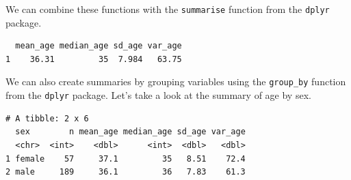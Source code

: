 \documentclass[]{book}
\newenvironment{Shaded}{\begin{snugshade}}{\end{snugshade}}
\newcommand{\CommentTok}[1]{\textcolor[rgb]{0.56,0.35,0.01}{\textit{#1}}}
\newcommand{\DataTypeTok}[1]{\textcolor[rgb]{0.13,0.29,0.53}{#1}}
\newcommand{\KeywordTok}[1]{\textcolor[rgb]{0.13,0.29,0.53}{\textbf{#1}}}
\newcommand{\NormalTok}[1]{#1}
\newcommand{\OperatorTok}[1]{\textcolor[rgb]{0.81,0.36,0.00}{\textbf{#1}}}
\newcommand{\OtherTok}[1]{\textcolor[rgb]{0.56,0.35,0.01}{#1}}
\newcommand{\StringTok}[1]{\textcolor[rgb]{0.31,0.60,0.02}{#1}}
\begin{document}
We can combine these functions with the \texttt{summarise} function from the \texttt{dplyr} package.

\begin{Shaded}
\end{Shaded}

\begin{verbatim}
  mean_age median_age sd_age var_age
1    36.31         35  7.984   63.75
\end{verbatim}

We can also create summaries by grouping variables using the \texttt{group\_by} function from the \texttt{dplyr} package. Let's take a look at the summary of age by sex.

\begin{Shaded}
\end{Shaded}

\begin{verbatim}
# A tibble: 2 x 6
  sex        n mean_age median_age sd_age var_age
  <chr>  <int>    <dbl>      <int>  <dbl>   <dbl>
1 female    57     37.1         35   8.51    72.4
2 male     189     36.1         36   7.83    61.3
\end{verbatim}
\end{document}
